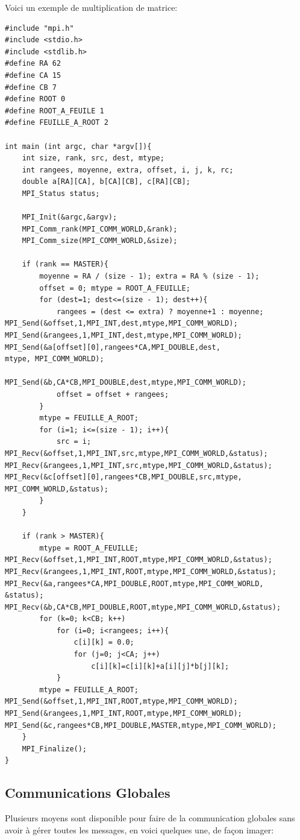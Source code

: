 \documentclass[oneside]{book}
\begin{document}
Voici un exemple de multiplication de matrice:\\
\begin{lstlisting}
#include "mpi.h"
#include <stdio.h>
#include <stdlib.h>
#define RA 62
#define CA 15
#define CB 7
#define ROOT 0
#define ROOT_A_FEUILE 1
#define FEUILLE_A_ROOT 2

int main (int argc, char *argv[]){
	int size, rank, src, dest, mtype;
	int rangees, moyenne, extra, offset, i, j, k, rc;
	double a[RA][CA], b[CA][CB], c[RA][CB];
	MPI_Status status;
	
	MPI_Init(&argc,&argv);
	MPI_Comm_rank(MPI_COMM_WORLD,&rank);
	MPI_Comm_size(MPI_COMM_WORLD,&size);
	
	if (rank == MASTER){ 
		moyenne = RA / (size - 1); extra = RA % (size - 1);
		offset = 0; mtype = ROOT_A_FEUILLE;
		for (dest=1; dest<=(size - 1); dest++){ 
			rangees = (dest <= extra) ? moyenne+1 : moyenne;
MPI_Send(&offset,1,MPI_INT,dest,mtype,MPI_COMM_WORLD);
MPI_Send(&rangees,1,MPI_INT,dest,mtype,MPI_COMM_WORLD);
MPI_Send(&a[offset][0],rangees*CA,MPI_DOUBLE,dest,
mtype, MPI_COMM_WORLD);

MPI_Send(&b,CA*CB,MPI_DOUBLE,dest,mtype,MPI_COMM_WORLD);
			offset = offset + rangees;
		}
		mtype = FEUILLE_A_ROOT;
		for (i=1; i<=(size - 1); i++){ 
			src = i;
MPI_Recv(&offset,1,MPI_INT,src,mtype,MPI_COMM_WORLD,&status);
MPI_Recv(&rangees,1,MPI_INT,src,mtype,MPI_COMM_WORLD,&status);
MPI_Recv(&c[offset][0],rangees*CB,MPI_DOUBLE,src,mtype,
MPI_COMM_WORLD,&status);
		}
	}
	
	if (rank > MASTER){ 
		mtype = ROOT_A_FEUILLE;
MPI_Recv(&offset,1,MPI_INT,ROOT,mtype,MPI_COMM_WORLD,&status);
MPI_Recv(&rangees,1,MPI_INT,ROOT,mtype,MPI_COMM_WORLD,&status);
MPI_Recv(&a,rangees*CA,MPI_DOUBLE,ROOT,mtype,MPI_COMM_WORLD,
&status);
MPI_Recv(&b,CA*CB,MPI_DOUBLE,ROOT,mtype,MPI_COMM_WORLD,&status);
		for (k=0; k<CB; k++)
			for (i=0; i<rangees; i++){ 
				c[i][k] = 0.0;
				for (j=0; j<CA; j++)
					c[i][k]=c[i][k]+a[i][j]*b[j][k];
			}
		mtype = FEUILLE_A_ROOT;
MPI_Send(&offset,1,MPI_INT,ROOT,mtype,MPI_COMM_WORLD);
MPI_Send(&rangees,1,MPI_INT,ROOT,mtype,MPI_COMM_WORLD);
MPI_Send(&c,rangees*CB,MPI_DOUBLE,MASTER,mtype,MPI_COMM_WORLD);
	}
	MPI_Finalize();
}
\end{lstlisting}

\subsection{Communications Globales}
Plusieurs moyens sont disponible pour faire de la communication globales sans avoir à gérer toutes les messages, en voici quelques une, de façon imager:\\
\end{document}
